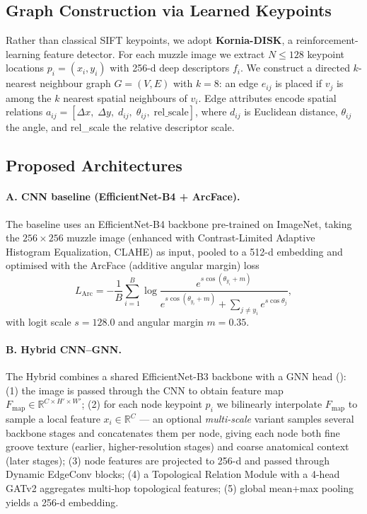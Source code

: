 \documentclass[11pt]{article}
\begin{document}
\subsection{Graph Construction via Learned Keypoints}
Rather than classical SIFT keypoints, we adopt \textbf{Kornia-DISK}, a reinforcement-learning
feature detector. For each muzzle image we extract $N \le 128$ keypoint locations
$p_i=(x_i,y_i)$ with 256-d deep descriptors $f_i$. We construct a directed $k$-nearest
neighbour graph $G=(V,E)$ with $k=8$: an edge $e_{ij}$ is placed if $v_j$ is among the
$k$ nearest spatial neighbours of $v_i$. Edge attributes encode spatial relations
$a_{ij}=[\Delta x,\;\Delta y,\;d_{ij},\;\theta_{ij},\;\text{rel\_scale}]$, where $d_{ij}$
is Euclidean distance, $\theta_{ij}$ the angle, and rel\_scale the relative descriptor scale.

\subsection{Proposed Architectures}

\paragraph{A. CNN baseline (EfficientNet-B4 + ArcFace).}
The baseline uses an EfficientNet-B4 backbone pre-trained on ImageNet, taking the
$256\times256$ muzzle image (enhanced with Contrast-Limited Adaptive Histogram
Equalization, CLAHE) as input, pooled to a 512-d embedding and
optimised with the ArcFace (additive angular margin) loss
\begin{equation}
L_{\text{Arc}} = -\frac{1}{B}\sum_{i=1}^{B}
\log\frac{e^{s\cos(\theta_{y_i}+m)}}
{e^{s\cos(\theta_{y_i}+m)}+\sum_{j\ne y_i}e^{s\cos\theta_j}},
\end{equation}
with logit scale $s=128.0$ and angular margin $m=0.35$.

\paragraph{B. Hybrid CNN--GNN.}
The Hybrid combines a shared EfficientNet-B3 backbone with a GNN head
(): (1) the image is passed through the CNN to obtain feature map
$F_{\text{map}}\in\mathbb{R}^{C\times H'\times W'}$; (2) for each node keypoint $p_i$ we
bilinearly interpolate $F_{\text{map}}$ to sample a local feature $x_i\in\mathbb{R}^{C}$ ---
an optional \emph{multi-scale} variant samples several backbone stages and concatenates
them per node, giving each node both fine groove texture (earlier, higher-resolution
stages) and coarse anatomical context (later stages); (3) node features are projected to
256-d and passed through Dynamic EdgeConv blocks; (4) a Topological Relation Module with a
4-head GATv2 aggregates multi-hop topological features; (5) global mean+max pooling yields
a 256-d embedding.
\end{document}
